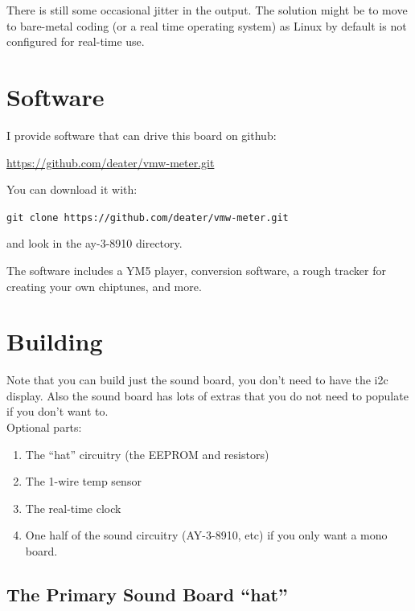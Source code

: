 \documentclass[11pt]{article}
\begin{document}
There is still some occasional jitter in the output.
The solution might be to move to bare-metal coding (or a real time operating
system) as Linux by default is not configured for real-time use.





\section{Software}

I provide software that can drive this board on github:

\url{https://github.com/deater/vmw-meter.git}

\noindent
You can download it with:

{\tt git clone https://github.com/deater/vmw-meter.git}

\noindent
and look in the ay-3-8910 directory.

The software includes a YM5 player, conversion software, a rough tracker
for creating your own chiptunes, and more.

\pagebreak

\section{Building}

Note that you can build just the sound board,
you don't need to have the i2c display.
Also the sound board has lots of extras that you do not
need to populate if you don't want to.\\

\noindent
Optional parts:
\begin{enumerate}
	\item The ``hat'' circuitry (the EEPROM and resistors)
	\item The 1-wire temp sensor
	\item The real-time clock
	\item One half of the sound circuitry (AY-3-8910, etc) if you only want
		a mono board.
\end{enumerate}


\subsection{The Primary Sound Board ``hat''}
\end{document}
